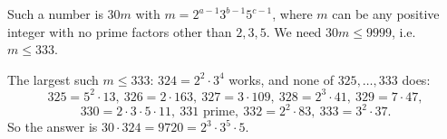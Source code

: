 Such a number is $30m$ with $m=2^{a-1}3^{b-1}5^{c-1}$, where $m$ can be any positive integer with no prime factors other than $2,3,5$. We need $30m\le9999$, i.e.\ $m\le333$.

The largest such $m\le333$: $324=2^2\cdot3^4$ works, and none of $325,\dots,333$ does:
\[
325=5^2\cdot13,\ 326=2\cdot163,\ 327=3\cdot109,\ 328=2^3\cdot41,\ 329=7\cdot47,
\]
\[
330=2\cdot3\cdot5\cdot11,\ 331\text{ prime},\ 332=2^2\cdot83,\ 333=3^2\cdot37 .
\]
So the answer is $30\cdot324=\boxed{9720}=2^3\cdot3^5\cdot5$.
